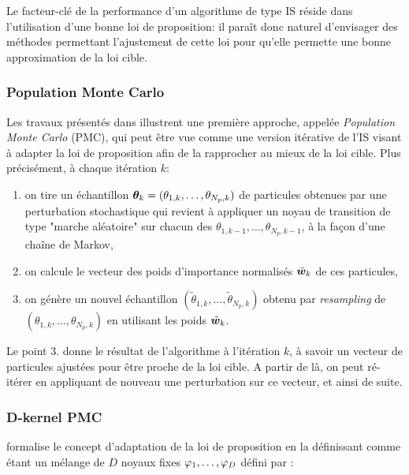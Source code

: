 Le facteur-clé de la performance d'un algorithme de type IS réside dans l'utilisation d'une bonne loi de proposition: il paraît donc naturel d'envisager des méthodes permettant l'ajustement de cette loi pour qu'elle permette une bonne approximation de la loi cible. \\

\subsubsection{Population Monte Carlo}

Les travaux présentés dans \cite{Cappe2004} illustrent une première approche, appelée \textit{Population Monte Carlo} (PMC), qui peut être vue comme une version itérative de l'IS visant à adapter la loi de proposition afin de la rapprocher au mieux de la loi cible. Plus précisément, à chaque itération $k$: 
\begin{enumerate}
	\item on tire un échantillon ${\bm{\theta}}_k = (\theta_{1,k}, \dots, \theta_{N_p,k})$ de particules obtenues par une perturbation stochastique qui revient à appliquer un noyau de transition de type "marche aléatoire" sur chacun des $\theta_{1,k-1}, \dots, \theta_{N_p,k-1}$, à la façon d'une chaîne de Markov,
	\item on calcule le vecteur des poids d'importance normalisés ${\tilde{\bm{w}}}_k$ de ces particules,
	\item on génère un nouvel échantillon $(\tilde{\theta}_{1,k}, \dots, \tilde{\theta}_{N_p,k})$ obtenu par \textit{resampling} de $ (\theta_{1,k}, \dots, \theta_{N_p,k})$ en utilisant les poids ${\tilde{\bm{w}}}_k$.

\end{enumerate}

Le point 3. donne le résultat de l'algorithme à l'itération $k$, à savoir un vecteur de particules ajustées pour être proche de la loi cible. A partir de là, on peut ré-itérer en appliquant de nouveau une perturbation sur ce vecteur, et ainsi de suite. 


\subsubsection{D-kernel PMC}

\cite{Douc2007} formalise le concept d'adaptation de la loi de proposition en la définissant comme étant un mélange de $D$ noyaux fixes ${\varphi}_1, \dots, {\varphi}_D$ défini par : 


